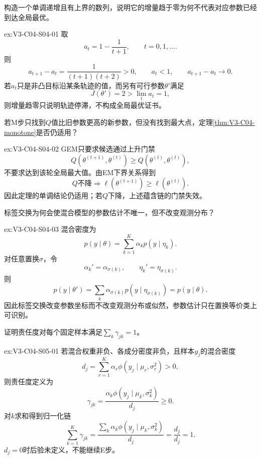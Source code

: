 \begin{SLChapterExercisePairSection}
\begin{exercise}\label{ex:V3-C04-S04-01}
构造一个单调递增且有上界的数列，说明它的增量趋于零为何不代表对应参数已经到达全局最优。
\end{exercise}
\ifSLFullEdition
{}\label{sol:V3-C04-S04-01}
\begin{chapterexercisesolution}{ex:V3-C04-S04-01}
取
\[
a_t=1-\frac1{t+1},
\qquad t=0,1,\ldots.
\]
则
\[
a_{t+1}-a_t
=\frac1{(t+1)(t+2)}>0,
\qquad
a_t<1,
\qquad
a_{t+1}-a_t\to0.
\]
若$a_t$只是非凸目标沿某条轨迹的值，而另有可行参数$\theta'$满足
\[
J(\theta')=2>\lim_ta_t=1,
\]
则增量趋零只说明轨迹停滞，不构成全局最优证书。
\end{chapterexercisesolution}
\fi

\begin{exercise}\label{ex:V3-C04-S04-02}
若M步只找到$Q$值比旧参数更高的新参数，但没有找到最大点，定理\ref{thm:V3-C04-monotone}是否仍适用？
\end{exercise}
\ifSLFullEdition
{}\label{sol:V3-C04-S04-02}
\begin{chapterexercisesolution}{ex:V3-C04-S04-02}
GEM只要求候选通过上升门禁
\[
Q(\theta^{(t+1)},\theta^{(t)})
\geq Q(\theta^{(t)},\theta^{(t)}),
\]
不要求达到该轮全局最大值。由EM下界关系得到
\[
Q\text{不降}
\Longrightarrow
\ell(\theta^{(t+1)})\geq\ell(\theta^{(t)}).
\]
因此定理的单调结论仍适用；若$Q$下降，上述蕴含链的门禁失效。
\end{chapterexercisesolution}
\fi

\begin{exercise}\label{ex:V3-C04-S04-03}
标签交换为何会使混合模型的参数估计不唯一，但不改变观测分布？
\end{exercise}
\ifSLFullEdition
{}\label{sol:V3-C04-S04-03}
\begin{chapterexercisesolution}{ex:V3-C04-S04-03}
混合密度为
\[
p(y\mid\theta)=\sum_{k=1}^{K}\alpha_kp(y\mid\eta_k).
\]
对任意置换$\sigma$，令
\[
\alpha_k'=\alpha_{\sigma(k)},
\qquad
\eta_k'=\eta_{\sigma(k)}.
\]
则
\[
p(y\mid\theta')
=\sum_k\alpha_{\sigma(k)}p(y\mid\eta_{\sigma(k)})
=p(y\mid\theta).
\]
因此标签交换改变参数坐标而不改变观测分布或似然，参数估计只在置换等价类上可识别。
\end{chapterexercisesolution}
\fi

\begin{exercise}\label{ex:V3-C04-S05-01}
证明责任度对每个固定样本满足$\sum_k\gamma_{jk}=1$。
\end{exercise}
\ifSLFullEdition
{}\label{sol:V3-C04-S05-01}
\begin{chapterexercisesolution}{ex:V3-C04-S05-01}
若混合权重非负、各成分密度非负，且样本$y_j$的混合密度
\[
d_j=\sum_{r=1}^{K}\alpha_r\phi(y_j\mid\mu_r,\sigma_r^2)>0,
\]
则责任度定义为
\[
\gamma_{jk}=\frac{\alpha_k\phi(y_j\mid\mu_k,\sigma_k^2)}{d_j}\geq0.
\]
对$k$求和得到归一化链
\[
\sum_{k=1}^{K}\gamma_{jk}
=\frac{\sum_k\alpha_k\phi(y_j\mid\mu_k,\sigma_k^2)}{d_j}
=\frac{d_j}{d_j}=1.
\]
$d_j=0$时后验未定义，不能继续E步。
\end{chapterexercisesolution}
\fi


\end{SLChapterExercisePairSection}

